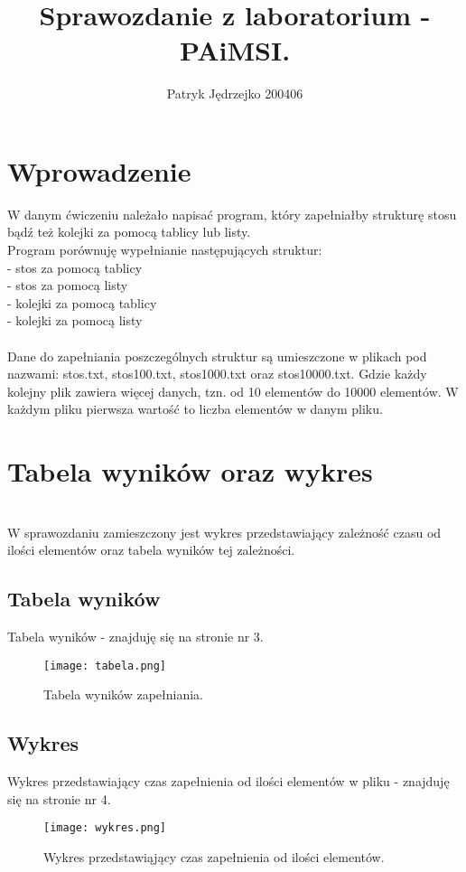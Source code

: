 \documentclass{article}
\author{Patryk Jędrzejko 200406}
\title{Sprawozdanie z laboratorium - PAiMSI.}
\begin{document}
\maketitle

\section{Wprowadzenie}
W danym ćwiczeniu należało napisać program, który zapełniałby strukturę stosu bądź też kolejki
za pomocą tablicy lub listy.
\\Program porównuję wypełnianie następujących struktur:
\\- stos za pomocą tablicy
\\- stos za pomocą listy
\\- kolejki za pomocą tablicy
\\- kolejki za pomocą listy
\\
\\Dane do zapełniania poszczególnych struktur są umieszczone w plikach pod nazwami: stos.txt, stos100.txt,
stos1000.txt oraz stos10000.txt. Gdzie każdy kolejny plik zawiera więcej danych, tzn. od 10
elementów do 10000 elementów. W każdym pliku pierwsza wartość to liczba elementów w danym pliku.

\section{Tabela wyników oraz wykres}
\\ W sprawozdaniu zamieszczony jest wykres przedstawiający zależność
czasu od ilości elementów oraz tabela wyników tej zależności.
\subsection{Tabela wyników}
Tabela wyników - znajduję się na stronie nr 3.
\begin{figure}[H]
\texttt{[image: tabela.png]}
\caption{Tabela wyników zapełniania.}
\label{fig:tabela.png}
\end{figure}
\subsection{Wykres}
Wykres przedstawiający czas zapełnienia od ilości elementów w pliku - znajduję się na stronie nr 4.
\begin{figure}[H]
\texttt{[image: wykres.png]}
\caption{Wykres przedstawiąjący czas zapełnienia od ilości elementów.}
\label{fig:wykres.png}
\end{figure}
\end{document}
